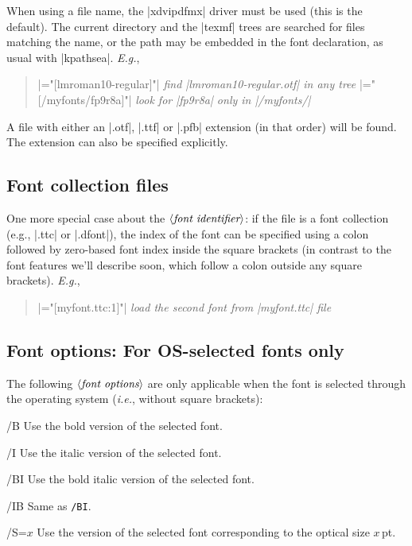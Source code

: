 \documentclass[12pt]{article}
\newenvironment{optdesc}
  {\begin{description}[font=\ttfamily,style=nextline,leftmargin=1.5cm]}
  {\end{description}}
\newcommand\xarg[1]{$\langle\hbox{\rmfamily\itshape #1}\rangle$}
\let\latin\textit
\def\ie{\latin{i.e.}}
\def\Eg{\latin{E.g.}}
\begin{document}
When using a file name, the |xdvipdfmx| driver must be used (this is the
default). The current directory and the |texmf| trees are searched for
files matching the name, or the path may be embedded in the font
declaration, as usual with |kpathsea|. \Eg,
\begin{quote}\small
|\font\1="[lmroman10-regular]"| \hfill
  {\em find |lmroman10-regular.otf| in any tree}
|\font\2="[/myfonts/fp9r8a]"| \hfill
  {\em look for |fp9r8a| only in |/myfonts/|}
\end{quote}

A file with either an |.otf|, |.ttf| or |.pfb| extension (in that order) will be found.  The
extension can also be specified explicitly.

\subsection{Font collection files}

One more special case about the \xarg{font identifier}: if the file is a
font collection (e.g., |.ttc| or |.dfont|), the index of the font can be
specified using a colon followed by zero-based font index inside the
square brackets (in contrast to the font features we'll describe soon,
which follow a colon outside any square brackets). \Eg,
\begin{quote}\small
|\font\2="[myfont.ttc:1]"| \hfill {\em load the second font from |myfont.ttc| file}
\end{quote}


\subsection{Font options: For OS-selected fonts only}

The following \xarg{font options} are only applicable when the font is selected
through the operating system (\ie, without square brackets):
\begin{optdesc}
\item[/B] Use the bold version of the selected font.
\item[/I] Use the italic version of the selected font.
\item[/BI] Use the bold italic version of the selected font.
\item[/IB] Same as \texttt{/BI}.
\item[/S=$x$] Use the version of the selected font corresponding to the
optical size $x$\,pt.
\end{optdesc}
\end{document}
